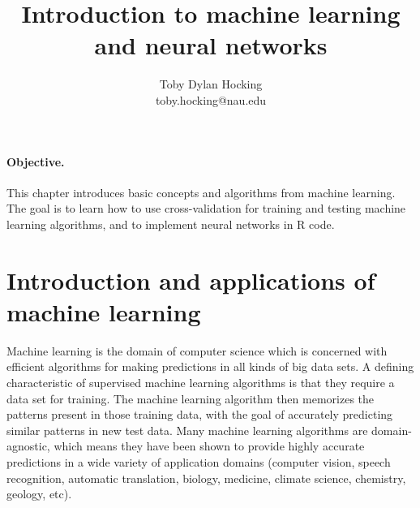 \documentclass[12pt]{article}
\begin{document}
\title{Introduction to machine learning and neural networks}

\author{
  Toby Dylan Hocking\\
  toby.hocking@nau.edu
}

\maketitle









\paragraph{Objective.} This chapter introduces basic concepts and
algorithms from machine learning. The goal is to learn how to use
cross-validation for training and testing machine learning algorithms,
and to implement neural networks in R code.

\section{Introduction and applications of machine learning}

Machine learning is the domain of computer science which is concerned
with efficient algorithms for making predictions in all kinds of big
data sets. A defining characteristic of supervised machine learning
algorithms is that they require a data set for training. The machine
learning algorithm then memorizes the patterns present in those
training data, with the goal of accurately predicting similar patterns
in new test data. Many machine learning algorithms are
domain-agnostic, which means they have been shown to provide highly
accurate predictions in a wide variety of application domains
(computer vision, speech recognition, automatic translation, biology,
medicine, climate science, chemistry, geology, etc). 
\end{document}
